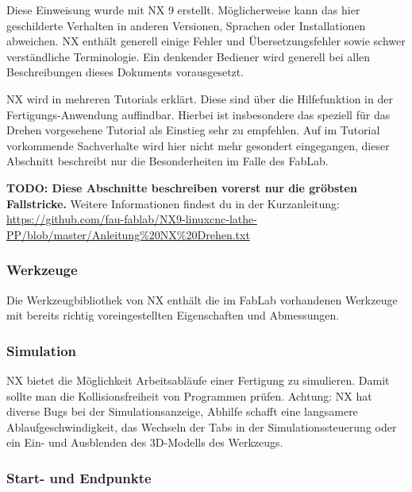 \documentclass{\basedir/fablab-document}
\newcommand{\todoUnwichtig}[1]{\textbf{TODO: #1} }
\begin{document}
Diese Einweisung wurde mit NX 9 erstellt. Möglicherweise kann das hier geschilderte Verhalten in anderen Versionen, Sprachen oder Installationen abweichen. NX enthält generell einige Fehler und Übersetzungsfehler sowie schwer verständliche Terminologie. Ein denkender Bediener wird generell bei allen Beschreibungen dieses Dokuments vorausgesetzt.

NX wird in mehreren Tutorials erklärt. Diese sind über die Hilfefunktion in der Fertigungs-Anwendung auffindbar. Hierbei ist insbesondere das speziell für das Drehen vorgesehene Tutorial als Einstieg sehr zu empfehlen. Auf im Tutorial vorkommende Sachverhalte wird hier nicht mehr gesondert eingegangen, dieser Abschnitt beschreibt nur die Besonderheiten im Falle des FabLab.

\todoUnwichtig{Diese Abschnitte beschreiben vorerst nur die gröbsten Fallstricke.} Weitere Informationen findest du in der Kurzanleitung: \url{https://github.com/fau-fablab/NX9-linuxcnc-lathe-PP/blob/master/Anleitung%20NX%20Drehen.txt}

\subsubsection{Werkzeuge}
Die Werkzeugbibliothek von NX enthält die im FabLab vorhandenen Werkzeuge mit bereits richtig voreingestellten Eigenschaften und Abmessungen. 



\subsubsection{Simulation}

NX bietet die Möglichkeit Arbeitsabläufe einer Fertigung zu simulieren. Damit sollte man die Kollisionsfreiheit von Programmen prüfen. Achtung: NX hat diverse Bugs bei der Simulationsanzeige, Abhilfe schafft eine langsamere Ablaufgeschwindigkeit, das Wechseln der Tabs in der Simulationssteuerung oder ein Ein- und Ausblenden des 3D-Modells des Werkzeugs.

\subsubsection{Start- und Endpunkte}
\end{document}
